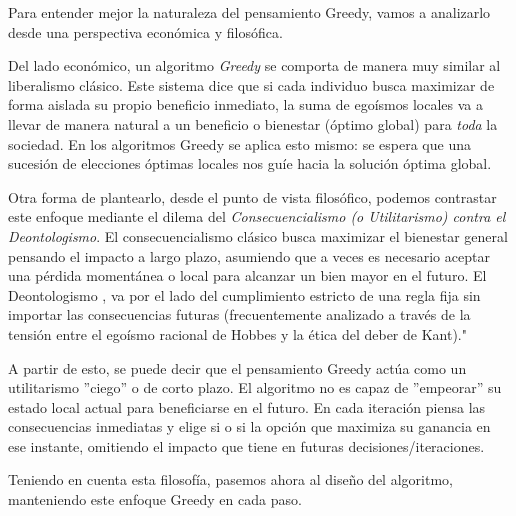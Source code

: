 Para entender mejor la naturaleza del pensamiento Greedy, vamos a analizarlo desde una perspectiva económica y filosófica.

Del lado económico, un algoritmo \textit{Greedy} se comporta de manera muy similar al liberalismo clásico. Este sistema dice que si cada individuo busca maximizar de forma aislada su propio beneficio inmediato, la suma de egoísmos locales va a llevar de manera natural a un beneficio o bienestar (óptimo global) para \textit{toda} la sociedad. En los algoritmos Greedy se aplica esto mismo: se espera que una sucesión de elecciones óptimas locales nos guíe hacia la solución óptima global.

Otra forma de plantearlo, desde el punto de vista filosófico, podemos contrastar este enfoque mediante el dilema del \textit{Consecuencialismo (o Utilitarismo) contra el Deontologismo}. El consecuencialismo clásico busca maximizar el bienestar general pensando el impacto a largo plazo, asumiendo que a veces es necesario aceptar una pérdida momentánea o local para alcanzar un bien mayor en el futuro. El Deontologismo , va por el lado del cumplimiento estricto de una regla fija sin importar las consecuencias futuras (frecuentemente analizado a través de la tensión entre el egoísmo racional de Hobbes y la ética del deber de Kant)."

A partir de esto, se puede decir que el pensamiento Greedy actúa como un utilitarismo ''ciego'' o de corto plazo. El algoritmo no es capaz de ''empeorar'' su estado local actual para beneficiarse en el futuro. En cada iteración piensa las consecuencias inmediatas y elige si o si la opción que maximiza su ganancia en ese instante, omitiendo el impacto que tiene en futuras decisiones/iteraciones.

Teniendo en cuenta esta filosofía, pasemos ahora al diseño del algoritmo, manteniendo este enfoque Greedy en cada paso.
